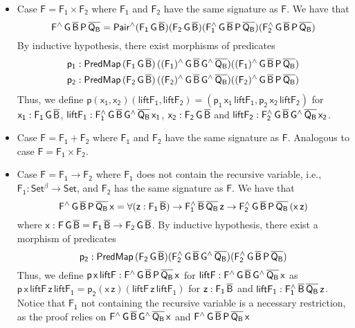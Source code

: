 \documentclass[9pt]{entcs} \usepackage{entcsmacro}
\begin{document}
\begin{itemize}
\item Case $\mathsf{F = F_1 \times F_2}$ where $\mathsf{F_1}$ and $\mathsf{F_2}$ have the same signature as $\mathsf{F}$.
We have that
\[
\mathsf{F^{\wedge}\,G\,\overline{B}\,P\,\overline{Q_B}
= Pair^{\wedge}(F_1\,G\,\overline{B})(F_2\,G\,\overline{B})(F_1^{\wedge}\,G\,\overline{B}\,P\,\overline{Q_B}) (F_2^{\wedge}\,G\,\overline{B}\,P\,\overline{Q_B})}
\]
By inductive hypothesis, there exist morphisms of predicates
\begin{gather*}
\mathsf{p_1 : PredMap\,(F_1\,G\,\overline{B})\,((F_1)^{\wedge}\,G\,\overline{B}\,G^{\wedge}\,\overline{Q_B}) ((F_1)^{\wedge}\,G\,\overline{B}\,P\,\overline{Q_B})} \\
\mathsf{p_2 : PredMap\,(F_2\,G\,\overline{B})\,((F_2)^{\wedge}\,G\,\overline{B}\,G^{\wedge}\,\overline{Q_B}) ((F_2)^{\wedge}\,G\,\overline{B}\,P\,\overline{Q_B})}
\end{gather*}
Thus, we define $\mathsf{p (x_1, x_2) (liftF_1, liftF_2) = (p_1\,x_1\,liftF_1, p_2\,x_2\,liftF_2)}$ 
for 
$\mathsf{x_1 : F_1\,G\,\overline{B}}$,
$\mathsf{liftF_1 : F_1^{\wedge}\,G\,\overline{B}\,G^{\wedge}\,\overline{Q_B}\,x_1}$,
$\mathsf{x_2 : F_2\,G\,\overline{B}}$
and $\mathsf{liftF_2 : F_2^{\wedge}\,G\,\overline{B}\,G^{\wedge}\,\overline{Q_B}\,x_2}$.
\item Case $\mathsf{F = F_1 + F_2}$ where $\mathsf{F_1}$ and $\mathsf{F_2}$ have the same signature as $\mathsf{F}$.
Analogous to case $\mathsf{F = F_1 \times F_2}$.
\item Case $\mathsf{F = F_1 \to F_2}$
where $\mathsf{F_1}$ does not contain the recursive variable,
i.e., $\mathsf{F_1 : Set^\beta \to Set}$,
and $\mathsf{F_2}$ has the same signature as $\mathsf{F}$.
We have that
\[
\mathsf{F^{\wedge}\,G\,\overline{B}\,P\,\overline{Q_B}\,x = \forall (z : F_1\,\overline{B}) \to F_1^{\wedge}\,\overline{B}\,\overline{Q_B}\,z \to F_2^{\wedge}\,G\,\overline{B}\,P\,\overline{Q_B}\,(x\,z)}
\]
where $\mathsf{x : F\,G\,\overline{B} = F_1\,\overline{B} \to F_2\,G\,\overline{B}}$.
By inductive hypothesis, there exist a morphism of predicates
\[
\mathsf{p_2 : PredMap\,(F_2\,G\,\overline{B}) (F_2^{\wedge}\,G\,\overline{B}\,G^{\wedge}\,\overline{Q_B}) (F_2^{\wedge}\,G\,\overline{B}\,P\,\overline{Q_B})}
\]
Thus, we define $\mathsf{p\,x\,liftF : F^{\wedge}\,G\,\overline{B}\,P\,\overline{Q_B}\,x}$
for $\mathsf{liftF : F^{\wedge}\,G\,\overline{B}\,G^{\wedge}\,\overline{Q_B}\,x}$
as $\mathsf{p\,x\,liftF\,z\,liftF_1 = p_2 (x\,z) (liftF\,z\,liftF_1)}$
for $\mathsf{z : F_1\,\overline{B}}$
and $\mathsf{liftF_1 : F_1^{\wedge}\,\overline{B}\,\overline{Q_B}\,z}$.
Notice that $\mathsf{F_1}$ not containing the recursive variable
is a necessary restriction, as the proof relies on
$\mathsf{F^{\wedge}\,G\,\overline{B}\,G^{\wedge}\,\overline{Q_B}\,x}$
and $\mathsf{F^{\wedge}\,G\,\overline{B}\,P\,\overline{Q_B}\,x}$

\end{itemize}
\end{document}
